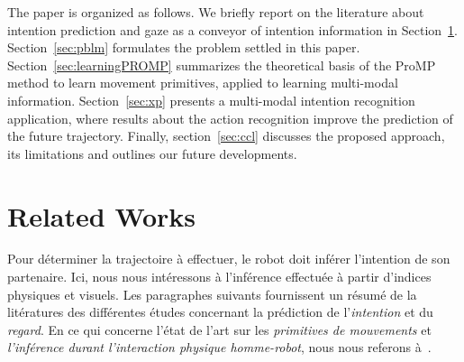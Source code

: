 \documentclass[runningheads,a4paper]{llncs}
\begin{document}
The paper is organized as follows. 
We briefly report on the literature about intention prediction and gaze as a conveyor of intention information in Section~\ref{sec:SOA}.
 Section~\ref{sec:pblm} formulates the problem settled in this paper.  Section~\ref{sec:learningPROMP} summarizes the theoretical basis of the ProMP method to learn movement primitives, applied to learning multi-modal information. Section~\ref{sec:xp} presents a multi-modal intention recognition application, where results about the action recognition improve the prediction of the future trajectory.
Finally, section~\ref{sec:ccl} discusses the proposed approach, its limitations and outlines our future developments.

\section{Related Works}
\label{sec:SOA}

Pour déterminer la trajectoire à effectuer, le robot doit inférer l'intention de son partenaire. Ici, nous nous intéressons à l'inférence effectuée à partir d'indices physiques et visuels. Les paragraphes suivants fournissent un résumé de la litératures des différentes études concernant la prédiction de l'\textit{intention} et du \textit{regard}. En ce qui concerne l'état de l'art sur les  \textit{primitives de mouvements} et \textit{l'inférence durant l'interaction physique homme-robot}, nous nous referons à~\cite{oriane2017}.
\end{document}
